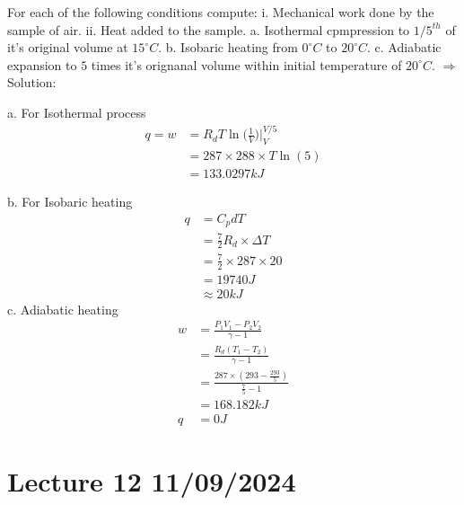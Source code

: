 \documentclass[fleqn,10pt]{SelfArx} %
\begin{document}
\begin{question}[label=q11.1]{For each of the following conditions compute: \newline
     i. Mechanical work done by the sample of air. \newline
     ii. Heat added to the sample. \newline
     a. Isothermal cpmpression to $1/5^{th}$ of it's original volume at $15^{\circ}C$. \newline
     b. Isobaric heating from $0^{\circ}C$ to $20^{\circ}C$.\newline
     c. Adiabatic expansion to $5$ times it's orignanal volume within initial temperature of $20^{\circ}C$.
}
$\Rightarrow$ Solution:

a. For Isothermal process
\begin{align*}
    q = w &= R_d T \ln\Big(\frac{1}{V}\Big)\Big|^{V/5}_{V}\\
          &= 287 \times 288 \times T \ln(5) \\
          &= 133.0297 kJ 
\end{align*}

b. For Isobaric heating
\begin{align*}
    q &= C_p dT \\
      &= \frac{7}{2} R_d \times \Delta T \\
      &= \frac{7}{2} \times 287 \times 20 \\
      &= 19740 J \\
      &\approx 20 kJ
\end{align*}
c. Adiabatic heating
\begin{align*}
    w &= \frac{P_1V_1 - P_2V_2}{\gamma -1} \\
      &= \frac{R_d (T_1 -T_2)}{\gamma -1} \\
      & = \frac{287 \times (293 - \frac{293}{5})}{\frac{7}{5} -1} \\
      &= 168.182 kJ \\
    q &= 0 J
\end{align*}
\end{question}

\clearpage

\section{Lecture 12 11/09/2024}
\end{document}
